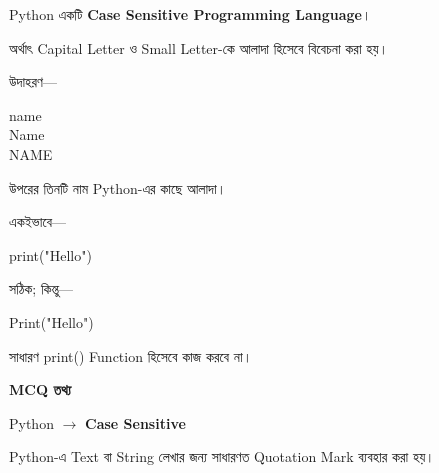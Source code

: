 

Python একটি
\textbf{Case Sensitive Programming Language}।

অর্থাৎ Capital Letter ও Small Letter-কে আলাদা হিসেবে
বিবেচনা করা হয়।

উদাহরণ—

\begin{codebox}

\begin{english}
\ttfamily
name\\
Name\\
NAME
\end{english}

\end{codebox}

উপরের তিনটি নাম Python-এর কাছে আলাদা।

একইভাবে—

\begin{codebox}

\begin{english}
\ttfamily
print("Hello")
\end{english}

\end{codebox}

সঠিক; কিন্তু—

\begin{codebox}

\begin{english}
\ttfamily
Print("Hello")
\end{english}

\end{codebox}

সাধারণ
\textenglish{\ttfamily print()}
Function হিসেবে কাজ করবে না।

\begin{rememberbox}

\textbf{\color{deepOrange}MCQ তথ্য}

Python
\(\longrightarrow\)
\textbf{Case Sensitive}

\end{rememberbox}



Python-এ Text বা String লেখার জন্য সাধারণত
Quotation Mark ব্যবহার করা হয়।

